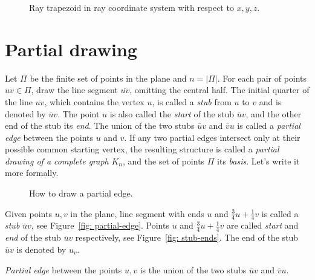 \begin{figure}
\begin{center}
  
\end{center}
\caption{Ray trapezoid in ray coordinate system with respect to $x,y,z$.}
\label{fig: ray-trapezoid}
\end{figure}

\section{Partial drawing}
Let $\Pi$ be the finite set of points in the plane and $n = |\Pi|$. For each pair of points $uv \in \Pi$, draw the line segment $\overline{uv}$, omitting the central half. The initial quarter of the line $\overline{uv}$, which contains the vertex $u$, is called a \textit{stub} from $u$ to $v$ and is denoted by $\overline{u}v$. The point $u$ is also called the \textit{start} of the stub $\overline{u}v$, and the other end of the stub its \textit{end}. The union of the two stubs $\overline{u}v$ and $\overline{v}u$ is called a \textit{partial edge} between the points $u$ and $v$. If any two partial edges intersect only at their possible common starting vertex, the resulting structure is called a \textit{partial drawing of a complete graph} $K_{n}$, and the set of points $\Pi$ its \textit{basis}. Let's write it more formally.

\begin{figure}

\caption{How to draw a partial edge.}
\label{fig: partial-edges}
\end{figure}

\begin{definition}[Stubs]
Given points $u, v$ in the plane, line segment with ends $u$ and $\frac{3}{4}u + \frac{1}{4}v$ is called a \textit{stub} $\overline{u}v$, see Figure~\ref{fig: partial-edge}. Points $u$ and $\frac{3}{4}u + \frac{1}{4}v$ are called \textit{start} and \textit{end} of the stub $\overline{u}v$ respectively, see Figure~\ref{fig: stub-ends}. The end of the stub $\overline{u}v$ is denoted by $u_{v}$.
\label{def: stubs}
\end{definition}

\begin{definition}
\textit{Partial edge} between the points $u, v$ is the union of the two stubs $\overline{u}v$ and $\overline{v}u$.
\label{def: partial-edge}
\end{definition}

